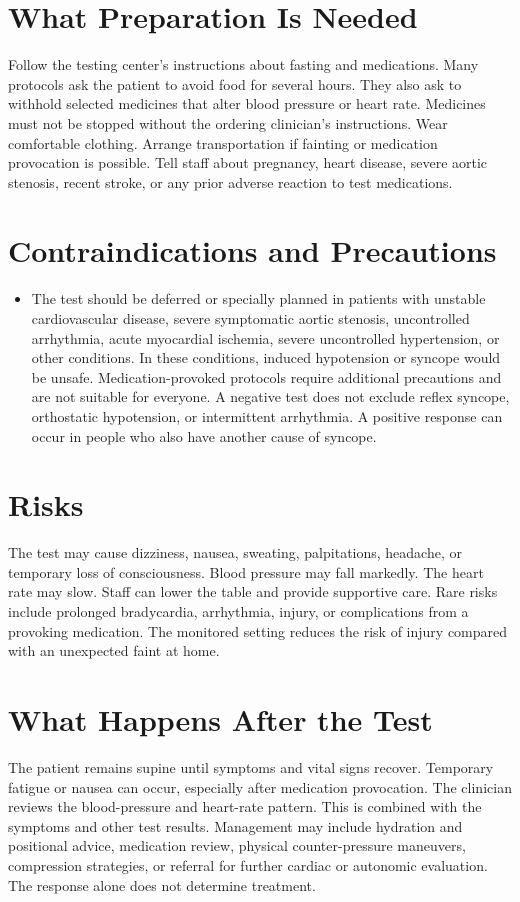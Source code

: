 \section*{What Preparation Is Needed}
Follow the testing center's instructions about fasting and medications. Many protocols ask the patient to avoid food for several hours. They also ask to withhold selected medicines that alter blood pressure or heart rate. Medicines must not be stopped without the ordering clinician's instructions. Wear comfortable clothing. Arrange transportation if fainting or medication provocation is possible. Tell staff about pregnancy, heart disease, severe aortic stenosis, recent stroke, or any prior adverse reaction to test medications.

\section*{Contraindications and Precautions}
\begin{itemize}
  \item The test should be deferred or specially planned in patients with unstable cardiovascular disease, severe symptomatic aortic stenosis, uncontrolled arrhythmia, acute myocardial ischemia, severe uncontrolled hypertension, or other conditions. In these conditions, induced hypotension or syncope would be unsafe. Medication-provoked protocols require additional precautions and are not suitable for everyone. A negative test does not exclude reflex syncope, orthostatic hypotension, or intermittent arrhythmia. A positive response can occur in people who also have another cause of syncope.
\end{itemize}
\section*{Risks}
The test may cause dizziness, nausea, sweating, palpitations, headache, or temporary loss of consciousness. Blood pressure may fall markedly. The heart rate may slow. Staff can lower the table and provide supportive care. Rare risks include prolonged bradycardia, arrhythmia, injury, or complications from a provoking medication. The monitored setting reduces the risk of injury compared with an unexpected faint at home.

\section*{What Happens After the Test}
The patient remains supine until symptoms and vital signs recover. Temporary fatigue or nausea can occur, especially after medication provocation. The clinician reviews the blood-pressure and heart-rate pattern. This is combined with the symptoms and other test results. Management may include hydration and positional advice, medication review, physical counter-pressure maneuvers, compression strategies, or referral for further cardiac or autonomic evaluation. The response alone does not determine treatment.

